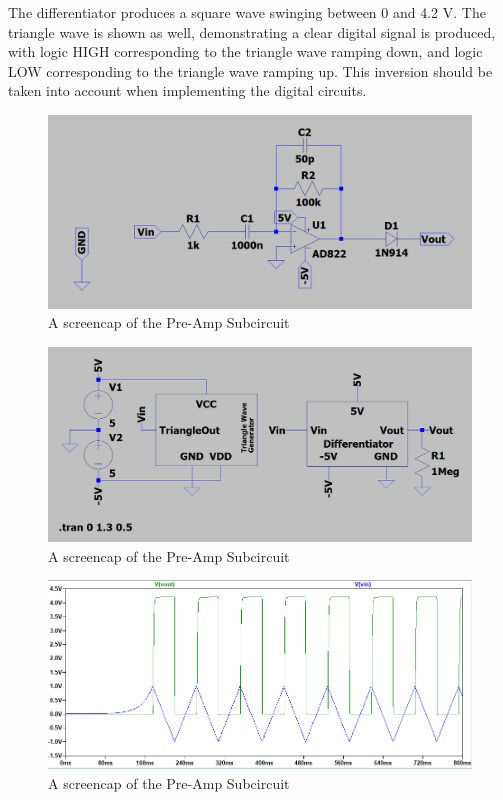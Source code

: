 The differentiator produces a square wave swinging between 0 and 4.2 V.
The triangle wave is shown as well, demonstrating a clear digital signal is produced, with logic HIGH corresponding to the triangle wave ramping down, and logic LOW corresponding to the triangle wave ramping up. 
This inversion should be taken into account when implementing the digital circuits.

\begin{figure}[H]
    \centering 
    \includegraphics[width=\textwidth]{../Circuits/Images/Differentiator/Schematic}
    \caption{A screencap of the Pre-Amp Subcircuit}
    \label{fig:differentiatorSchematic}
\end{figure}

\begin{figure}[H]
    \centering 
    \includegraphics[width=\textwidth]{../Circuits/Images/Differentiator/TestBench}
    \caption{A screencap of the Pre-Amp Subcircuit}
    \label{fig:differentiatorTestBench}
\end{figure}

\begin{figure}[H]
    \centering 
    \includegraphics[width=\textwidth]{../Circuits/Images/Differentiator/TestBenchWaveform}
    \caption{A screencap of the Pre-Amp Subcircuit}
    \label{fig:differentiatorTestBenchWaveform}
\end{figure}

